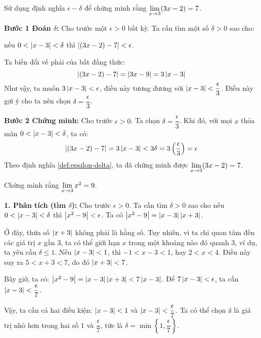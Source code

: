 \begin{example}
    Sử dụng định nghĩa $\epsilon-\delta$ để chứng minh rằng $\lim\limits_{x \to 3} (3x - 2) = 7$.
\end{example}
\textbf{Bước 1 Đoán $\delta$:} Cho trước một $\epsilon > 0$ bất kỳ. Ta cần tìm một số $\delta > 0$ sao cho:
\begin{center}
    nếu $0 < \left\lvert x-3 \right\rvert < \delta$ thì $\left\lvert (3x-2) - 7 \right\rvert < \epsilon$.
\end{center}
Ta biến đổi vế phải của bất đẳng thức:
\begin{equation*}
    \left\lvert (3x-2) - 7 \right\rvert = \left\lvert 3x - 9 \right\rvert = 3\left\lvert x-3 \right\rvert
\end{equation*}
Như vậy, ta muốn $3\left\lvert x-3 \right\rvert < \epsilon$, điều này tương đương với $\left\lvert x-3 \right\rvert < \dfrac{\epsilon}{3}$.
Điều này gợi ý cho ta nên chọn $\delta = \dfrac{\epsilon}{3}$.

\textbf{Bước 2 Chứng minh:} Cho trước $\epsilon > 0$. Ta chọn $\delta = \dfrac{\epsilon}{3}$.
Khi đó, với mọi $x$ thỏa mãn $0 < \left\lvert x-3 \right\rvert < \delta$, ta có:
\begin{equation*}
    \left\lvert (3x-2) - 7 \right\rvert = 3\left\lvert x-3 \right\rvert < 3\delta = 3\left(\dfrac{\epsilon}{3}\right) = \epsilon
\end{equation*}
Theo định nghĩa \ref{def:epsilon-delta}, ta đã chứng minh được $\lim\limits_{x \to 3} (3x - 2) = 7$.

\begin{example}
    Chứng minh rằng $\lim\limits_{x \to 3} x^2 = 9$.
\end{example}

\textbf{1. Phân tích (tìm $\delta$):} Cho trước $\epsilon > 0$. Ta cần tìm $\delta > 0$ sao cho nếu $0 < \left\lvert x-3 \right\rvert < \delta$ thì $\left\lvert x^2 - 9 \right\rvert < \epsilon$.
Ta có $\left\lvert x^2 - 9 \right\rvert = \left\lvert x-3 \right\rvert\left\lvert x+3 \right\rvert$.

Ở đây, thừa số $\left\lvert x+3 \right\rvert$ không phải là hằng số. Tuy nhiên, vì ta chỉ quan tâm đến các giá trị $x$ gần 3, ta có thể giới hạn $x$ trong một khoảng nào đó quanh 3, ví dụ, ta yêu cầu $\delta \le 1$.
Nếu $\left\lvert x-3 \right\rvert < 1$, thì $-1 < x-3 < 1$, hay $2 < x < 4$.
Điều này suy ra $5 < x+3 < 7$, do đó $\left\lvert x+3 \right\rvert < 7$.

Bây giờ, ta có: $\left\lvert x^2 - 9 \right\rvert = \left\lvert x-3 \right\rvert\left\lvert x+3 \right\rvert < 7\left\lvert x-3 \right\rvert$.
Để $7\left\lvert x-3 \right\rvert < \epsilon$, ta cần $\left\lvert x-3 \right\rvert < \dfrac{\epsilon}{7}$.

Vậy, ta cần cả hai điều kiện: $\left\lvert x-3 \right\rvert < 1$ và $\left\lvert x-3 \right\rvert < \dfrac{\epsilon}{7}$. Ta có thể chọn $\delta$ là giá trị nhỏ hơn trong hai số $1$ và $\dfrac{\epsilon}{7}$, tức là $\delta = \min\left\{1, \dfrac{\epsilon}{7}\right\}$.

